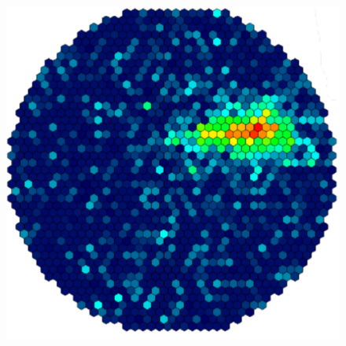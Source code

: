 \documentclass[aspectratio=1610, professionalfonts, 9pt]{beamer}
\begin{document}
\begin{frame}
\begin{columns}[onlytextwidth]
\begin{figure}
	  \includegraphics[height=0.8\textheight]{./images/Hadron.pdf}
	  \cite{FACT}
	\end{figure}
  \end{columns}
\end{frame}
\end{document}
